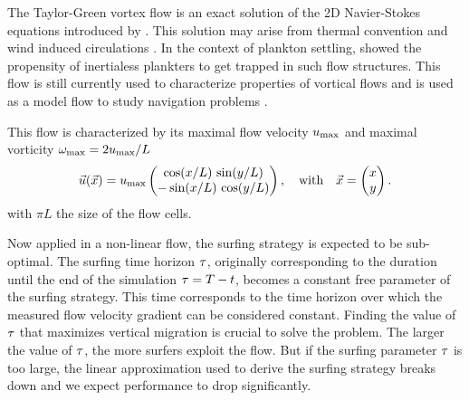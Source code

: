 The Taylor-Green vortex flow is an exact solution of the 2D Navier-Stokes equations introduced by \citet{taylor1937mechanism}.
This solution may arise from thermal convention and wind induced \citet{langmuir1938surface} circulations \citep{woodcock1941surface}.
In the context of plankton settling, \citet{stommel1949trajectories} showed the propensity of inertialess plankters to get trapped in such flow structures.
This flow is still currently used to characterize properties of vortical flows \citep{samant2021dynamic} and is used as a model flow to study navigation problems \citep{colabrese2017flow, qiu2022navigation}.

This flow is characterized by its maximal flow velocity $u_{\mathrm{max}}$ and maximal vorticity $\omega_{\mathrm{max}} = 2 u_{\mathrm{max}} / L$
\begin{equation}\label{eq:taylor_green_vortex_velocity}
	\vec{u}(\vec{x}) = u_{\mathrm{max}}
	\begin{pmatrix}
		\cos (x/L) \, \sin (y/L) \\
		-\sin (x/L) \, \cos (y/L)
	\end{pmatrix},
	\quad \text{with} \quad
	\vec{x} =
	\begin{pmatrix}
		x \\
		y
	\end{pmatrix}.
\end{equation}
with $\pi L$ the size of the flow cells.

Now applied in a non-linear flow, the surfing strategy is expected to be sub-optimal. 
The surfing time horizon $\tau$, originally corresponding to the duration until the end of the simulation $\tau = T - t$, becomes a constant free parameter of the surfing strategy.
This time corresponds to the time horizon over which the measured flow velocity gradient can be considered constant.
Finding the value of $\tau$ that maximizes vertical migration is crucial to solve the problem.
The larger the value of $\tau$, the more surfers exploit the flow. 
But if the surfing parameter $\tau$ is too large, the linear approximation used to derive the surfing strategy breaks down and we expect performance to drop significantly.

